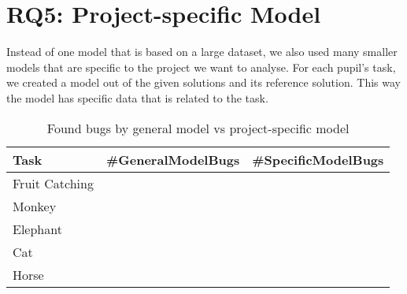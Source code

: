 \section{RQ5: Project-specific Model}\label{sec:project-specific}
Instead of one model that is based on a large dataset, we also used many smaller models that are specific to the project we want to analyse. For each pupil's task, we created a model out of the given solutions and its reference solution. This way the model has specific data that is related to the task.

\begin{table}[H]
    \centering
    \caption[Found bugs by general model vs project-specific model]{\label{tab:violations}Found bugs by general model vs project-specific model}
    \begin{tabular}{lrr}
        \toprule
        Task & \#GeneralModelBugs & \#SpecificModelBugs \\
        \midrule
        Fruit Catching  & &  \\
        Monkey  & & \\
        Elephant  & &  \\
        Cat  & &  \\
        Horse & & \\
        \bottomrule
    \end{tabular}
\end{table}
